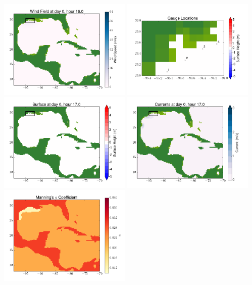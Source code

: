 \documentclass[11pt]{article}
\begin{document}
\vskip 10pt 
\includegraphics[width=0.475\textwidth]{frame0088fig9.png}
\includegraphics[width=0.475\textwidth]{frame0088fig10.png}
\vskip 10pt 
\includegraphics[width=0.475\textwidth]{frame0089fig1.png}
\includegraphics[width=0.475\textwidth]{frame0089fig2.png}
\vskip 10pt 
\includegraphics[width=0.475\textwidth]{frame0089fig3.png}
\end{document}
